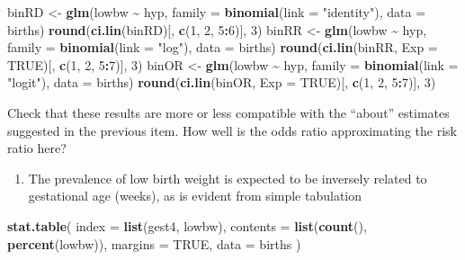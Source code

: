 \documentclass[
]{book}
\newenvironment{Shaded}{\begin{snugshade}}{\end{snugshade}}
\newcommand{\AttributeTok}[1]{\textcolor[rgb]{0.13,0.29,0.53}{#1}}
\newcommand{\ConstantTok}[1]{\textcolor[rgb]{0.56,0.35,0.01}{#1}}
\newcommand{\DecValTok}[1]{\textcolor[rgb]{0.00,0.00,0.81}{#1}}
\newcommand{\FunctionTok}[1]{\textcolor[rgb]{0.13,0.29,0.53}{\textbf{#1}}}
\newcommand{\NormalTok}[1]{#1}
\newcommand{\OtherTok}[1]{\textcolor[rgb]{0.56,0.35,0.01}{#1}}
\newcommand{\SpecialCharTok}[1]{\textcolor[rgb]{0.81,0.36,0.00}{\textbf{#1}}}
\newcommand{\StringTok}[1]{\textcolor[rgb]{0.31,0.60,0.02}{#1}}
\providecommand{\tightlist}{%
  \setlength{\itemsep}{0pt}\setlength{\parskip}{0pt}}
\begin{document}
\begin{Shaded}
\begin{Highlighting}[]
\NormalTok{binRD }\OtherTok{\textless{}{-}} \FunctionTok{glm}\NormalTok{(lowbw }\SpecialCharTok{\textasciitilde{}}\NormalTok{ hyp, }\AttributeTok{family =} \FunctionTok{binomial}\NormalTok{(}\AttributeTok{link =} \StringTok{"identity"}\NormalTok{), }\AttributeTok{data =}\NormalTok{ births)}
\FunctionTok{round}\NormalTok{(}\FunctionTok{ci.lin}\NormalTok{(binRD)[, }\FunctionTok{c}\NormalTok{(}\DecValTok{1}\NormalTok{, }\DecValTok{2}\NormalTok{, }\DecValTok{5}\SpecialCharTok{:}\DecValTok{6}\NormalTok{)], }\DecValTok{3}\NormalTok{)}
\NormalTok{binRR }\OtherTok{\textless{}{-}} \FunctionTok{glm}\NormalTok{(lowbw }\SpecialCharTok{\textasciitilde{}}\NormalTok{ hyp, }\AttributeTok{family =} \FunctionTok{binomial}\NormalTok{(}\AttributeTok{link =} \StringTok{"log"}\NormalTok{), }\AttributeTok{data =}\NormalTok{ births)}
\FunctionTok{round}\NormalTok{(}\FunctionTok{ci.lin}\NormalTok{(binRR, }\AttributeTok{Exp =} \ConstantTok{TRUE}\NormalTok{)[, }\FunctionTok{c}\NormalTok{(}\DecValTok{1}\NormalTok{, }\DecValTok{2}\NormalTok{, }\DecValTok{5}\SpecialCharTok{:}\DecValTok{7}\NormalTok{)], }\DecValTok{3}\NormalTok{)}
\NormalTok{binOR }\OtherTok{\textless{}{-}} \FunctionTok{glm}\NormalTok{(lowbw }\SpecialCharTok{\textasciitilde{}}\NormalTok{ hyp, }\AttributeTok{family =} \FunctionTok{binomial}\NormalTok{(}\AttributeTok{link =} \StringTok{"logit"}\NormalTok{), }\AttributeTok{data =}\NormalTok{ births)}
\FunctionTok{round}\NormalTok{(}\FunctionTok{ci.lin}\NormalTok{(binOR, }\AttributeTok{Exp =} \ConstantTok{TRUE}\NormalTok{)[, }\FunctionTok{c}\NormalTok{(}\DecValTok{1}\NormalTok{, }\DecValTok{2}\NormalTok{, }\DecValTok{5}\SpecialCharTok{:}\DecValTok{7}\NormalTok{)], }\DecValTok{3}\NormalTok{)}
\end{Highlighting}
\end{Shaded}

Check that these results are more or less compatible with the
``about'' estimates suggested in the previous item.
How well is the odds ratio approximating the risk ratio here?

\begin{enumerate}
\def\labelenumi{\arabic{enumi}.}
\setcounter{enumi}{2}
\tightlist
\item
  The prevalence of low birth weight is expected to be inversely related
  to gestational age (weeks), as is evident from simple tabulation
\end{enumerate}

\begin{Shaded}
\begin{Highlighting}[]
\FunctionTok{stat.table}\NormalTok{(}
  \AttributeTok{index =} \FunctionTok{list}\NormalTok{(gest4, lowbw),}
  \AttributeTok{contents =} \FunctionTok{list}\NormalTok{(}\FunctionTok{count}\NormalTok{(), }\FunctionTok{percent}\NormalTok{(lowbw)),}
  \AttributeTok{margins =} \ConstantTok{TRUE}\NormalTok{, }\AttributeTok{data =}\NormalTok{ births}
\NormalTok{)}
\end{Highlighting}
\end{Shaded}
\end{document}
